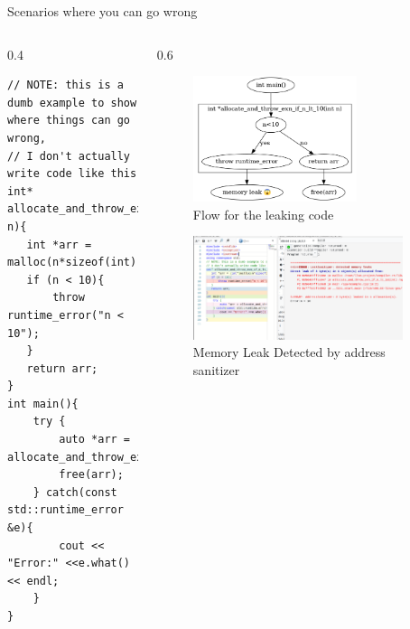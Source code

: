 \documentclass[
  10pt,
  ignorenonframetext,
]{beamer}
\begin{document}
\begin{frame}[fragile]{Scenarios where you can go
wrong}
\protect\hypertarget{scenarios-where-you-can-go-wrong}{}
\begin{columns}[T]
\begin{column}{0.4\textwidth}
\vspace{30pt}
\tiny

\begin{verbatim}
// NOTE: this is a dumb example to show where things can go wrong,
// I don't actually write code like this
int* allocate_and_throw_exn_if_n_lt_10(int n){
   int *arr = malloc(n*sizeof(int));
   if (n < 10){
       throw runtime_error("n < 10");
   }
   return arr;
}
int main(){
    try {
        auto *arr = allocate_and_throw_exn_if_n_lt_10(2);
        free(arr);
    } catch(const std::runtime_error &e){
        cout << "Error:" <<e.what() << endl;
    }
}
\end{verbatim}

\normalsize
\end{column}

\begin{column}{0.6\textwidth}
\begin{figure}
\centering
\includegraphics[width=0.7\textwidth,height=\textheight]{mem_management_leak_scenario1.png}
\caption{Flow for the leaking code}
\end{figure}

\begin{figure}
\centering
\includegraphics[width=0.9\textwidth,height=\textheight]{./leak_detected.png}
\caption{Memory Leak Detected by address
sanitizer}
\end{figure}
\end{column}
\end{columns}
\end{frame}
\end{document}
